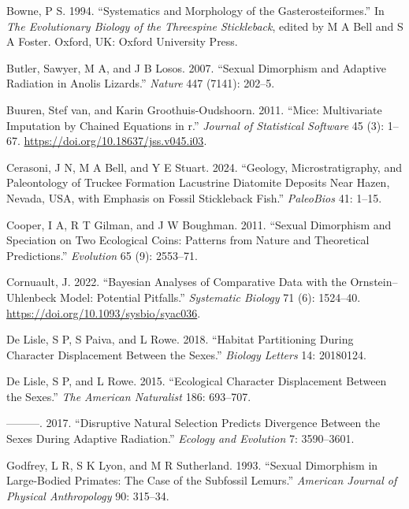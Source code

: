 \documentclass[
  12pt,
]{article}
\newlength{\cslhangindent}
\newlength{\cslentryspacingunit} %
\newenvironment{CSLReferences}[2] %
 {%
  \setlength{\parindent}{0pt}
  \ifodd #1
  \let\oldpar\par
  \def\par{\hangindent=\cslhangindent\oldpar}
  \fi
  \setlength{\parskip}{#2\cslentryspacingunit}
 }%
 {}
\begin{document}
\begin{CSLReferences}{1}{0}
\leavevmode{}%
Bowne, P S. 1994. {``Systematics and Morphology of the
Gasterosteiformes.''} In \emph{The Evolutionary Biology of the
Threespine Stickleback}, edited by M A Bell and S A Foster. Oxford, UK:
Oxford University Press.

\leavevmode{}%
Butler, Sawyer, M A, and J B Losos. 2007. {``Sexual Dimorphism and
Adaptive Radiation in Anolis Lizards.''} \emph{Nature} 447 (7141):
202--5.

\leavevmode{}%
Buuren, Stef van, and Karin Groothuis-Oudshoorn. 2011. {``Mice:
Multivariate Imputation by Chained Equations in r.''} \emph{Journal of
Statistical Software} 45 (3): 1--67.
\url{https://doi.org/10.18637/jss.v045.i03}.

\leavevmode{}%
Cerasoni, J N, M A Bell, and Y E Stuart. 2024. {``Geology,
Microstratigraphy, and Paleontology of Truckee Formation Lacustrine
Diatomite Deposits Near Hazen, Nevada, USA, with Emphasis on Fossil
Stickleback Fish.''} \emph{PaleoBios} 41: 1--15.

\leavevmode{}%
Cooper, I A, R T Gilman, and J W Boughman. 2011. {``Sexual Dimorphism
and Speciation on Two Ecological Coins: Patterns from Nature and
Theoretical Predictions.''} \emph{Evolution} 65 (9): 2553--71.

\leavevmode{}%
Cornuault, J. 2022. {``Bayesian Analyses of Comparative Data with the
Ornstein--Uhlenbeck Model: Potential Pitfalls.''} \emph{Systematic
Biology} 71 (6): 1524--40. \url{https://doi.org/10.1093/sysbio/syac036}.

\leavevmode{}%
De Lisle, S P, S Paiva, and L Rowe. 2018. {``Habitat Partitioning During
Character Displacement Between the Sexes.''} \emph{Biology Letters} 14:
20180124.

\leavevmode{}%
De Lisle, S P, and L Rowe. 2015. {``Ecological Character Displacement
Between the Sexes.''} \emph{The American Naturalist} 186: 693--707.

\leavevmode{}%
---------. 2017. {``Disruptive Natural Selection Predicts Divergence
Between the Sexes During Adaptive Radiation.''} \emph{Ecology and
Evolution} 7: 3590--3601.

\leavevmode{}%
Godfrey, L R, S K Lyon, and M R Sutherland. 1993. {``Sexual Dimorphism
in Large-Bodied Primates: The Case of the Subfossil Lemurs.''}
\emph{American Journal of Physical Anthropology} 90: 315--34.


\end{CSLReferences}
\end{document}
